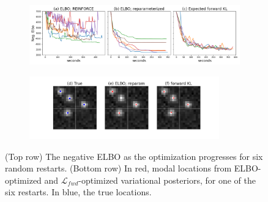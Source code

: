 \begin{figure}[!htb]
    \centering
    \begin{subfigure}[t]{0.9\textwidth}
    \centering
    \includegraphics[width=\textwidth]{figures/elbo_vs_sleep/optim_path_compare.png}
    \end{subfigure}
    \begin{subfigure}[t]{\textwidth}
    \centering
    \includegraphics[width=0.9\textwidth]{figures/elbo_vs_sleep/optim_path_detect_compare.png}
    \end{subfigure}
    \vspace{-1.5cm}
    \caption{(Top row) The negative ELBO as the optimization progresses for six random restarts.
    (Bottom row) In red, modal locations from ELBO-optimized and $\mathcal{L}_{fwd}$-optimized variational posteriors, for one of the six restarts.
    In blue, the true locations. }
    \label{fig:optim_path}
\end{figure}


